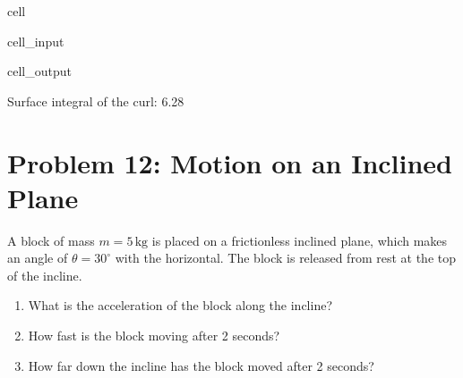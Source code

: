\documentclass[letterpaper,10pt,english]{jupyterBook}
\begin{document}
\begin{sphinxuseclass}{cell}\begin{sphinxVerbatimInput}

\begin{sphinxuseclass}{cell_input}
\begin{sphinxVerbatim}[commandchars=\\\{\}]
      
    

    
\end{sphinxVerbatim}

\end{sphinxuseclass}\end{sphinxVerbatimInput}
\begin{sphinxVerbatimOutput}

\begin{sphinxuseclass}{cell_output}
\begin{sphinxVerbatim}[commandchars=\\\{\}]
Surface integral of the curl: 6.28
\end{sphinxVerbatim}

\end{sphinxuseclass}\end{sphinxVerbatimOutput}

\end{sphinxuseclass}

\section{Problem 12: Motion on an Inclined Plane}
\label{\detokenize{prerequisites:problem-12-motion-on-an-inclined-plane}}
\sphinxAtStartPar
A block of mass \( m = 5 \, \text{kg} \) is placed on a frictionless inclined plane, which makes an angle of \( \theta = 30^\circ \) with the horizontal. The block is released from rest at the top of the incline.
\begin{enumerate}
%
\item {} 
\sphinxAtStartPar
What is the acceleration of the block along the incline?

\item {} 
\sphinxAtStartPar
How fast is the block moving after 2 seconds?

\item {} 
\sphinxAtStartPar
How far down the incline has the block moved after 2 seconds?

\end{enumerate}
\end{document}
